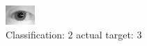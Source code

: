 \begin{figure}[h!]
\begin{center}
\includegraphics[width=0.60\columnwidth]{figures/ID1196_class_2_target_3.png}
\end{center}
\caption{ Classification: 2 actual target: 3}
\label{fig:ID1196_class_2_target_3}
\end{figure}
